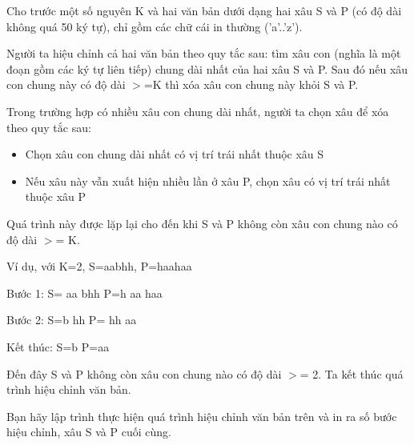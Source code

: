 Cho trước một số nguyên K và hai văn bản dưới dạng hai xâu S và P (có độ dài không quá 50 ký tự), chỉ gồm các chữ cái in thường ('a'..'z').  

   Người ta hiệu chỉnh cả hai văn bản theo quy tắc sau: tìm xâu con (nghĩa là một đoạn gồm các ký tự liên tiếp) chung dài nhất của hai xâu S và P. Sau đó nếu xâu con chung này có độ dài $>$=K thì xóa xâu con chung này khỏi S và P.  

   Trong trường hợp có nhiều xâu con chung dài nhất, người ta chọn xâu để xóa theo quy tắc sau:  
\begin{itemize}
	\item     Chọn xâu con chung dài nhất có vị trí trái nhất thuộc xâu S   
	\item     Nếu xâu này vẫn xuất hiện nhiều lần ở xâu P, chọn xâu có vị trí trái nhất thuộc xâu P   
\end{itemize}

   Quá trình này được lặp lại cho đến khi S và P không còn xâu con chung nào có độ dài $>$= K.  

   Ví dụ, với K=2, S=aabhh, P=haahaa  

   Bước 1:  S=       aa      bhh  P=h       aa      haa  

   Bước 2:  S=b       hh      P=       hh      aa  

   Kết thúc: S=b   P=aa  

   Đến đây S và P không còn xâu con chung nào có độ dài $>$= 2. Ta kết thúc quá trình hiệu chỉnh văn bản.  

   Bạn hãy lập trình thực hiện quá trình hiệu chỉnh văn bản trên và in ra số bước hiệu chỉnh, xâu S và P cuối cùng.